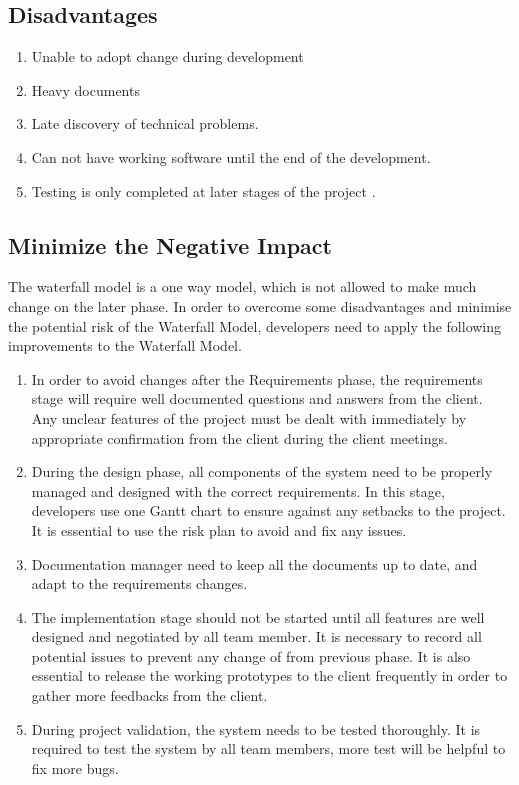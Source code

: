 \documentclass[11pt, a4paper]{report}
\begin{document}
\subsection{Disadvantages}
\begin{enumerate}
	\item  Unable to adopt change during development
	\item  Heavy documents
	\item  Late discovery of technical problems.
	\item  Can not have working software until the end of the development.
	\item  Testing is only completed at later stages of the project .

\end{enumerate}

\subsection{Minimize the Negative Impact}
The waterfall model is a one way model, which is not allowed to make much change on the later phase. In order to overcome some disadvantages and minimise the potential risk of the Waterfall Model, developers need to apply the following improvements to the Waterfall Model.

\begin{enumerate}
	\item  In order to avoid changes after the Requirements phase, the requirements stage will require well documented questions and answers from the client. Any unclear features of the project must be dealt with immediately by appropriate confirmation from the client during the client meetings.
	\item  During the design phase, all components of the system need to be properly managed and designed with the correct requirements. In this stage, developers use one Gantt chart to ensure against any setbacks to the project. It is essential to use the risk plan to avoid and fix any issues.
	\item  Documentation manager need to keep all the documents up to date, and adapt to the requirements changes.
	\item  The implementation stage should not be started until all features are well designed and negotiated by all team member. It is necessary to record all potential issues to prevent any change of from previous phase. It is also essential to release the working prototypes to the client frequently in order to gather more feedbacks from the client.  
	\item  During project validation, the system needs to be tested thoroughly. It is required to test the system by all team members, more test will be helpful to fix more bugs. 
\end{enumerate}
\end{document}
